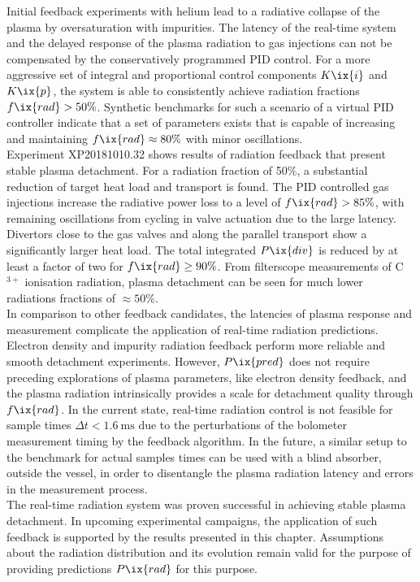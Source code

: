         Initial feedback experiments with helium lead to a radiative collapse of the plasma by oversaturation with impurities. The latency of the real-time system and the delayed response of the plasma radiation to gas injections can not be compensated by the conservatively programmed PID control. For a more aggressive set of integral and proportional control components $K\ix{i}$ and $K\ix{p}$, the system is able to consistently achieve radiation fractions $f\ix{rad}>50\%$. Synthetic benchmarks for such a scenario of a virtual PID controller indicate that a set of parameters exists that is capable of increasing and maintaining $f\ix{rad}\approx 80\%$ with minor oscillations.\\%
        Experiment XP20181010.32 shows results of radiation feedback that present stable plasma detachment. For a radiation fraction of 50\%, a substantial reduction of target heat load and transport is found. The PID controlled gas injections increase the radiative power loss to a level of $f\ix{rad}>85\%$, with remaining oscillations from cycling in valve actuation due to the large latency. Divertors close to the gas valves and along the parallel transport show a significantly larger heat load. The total integrated $P\ix{div}$ is reduced by at least a factor of two for $f\ix{rad}\ge90\%$. From filterscope measurements of C$^{3+}$ ionisation radiation, plasma detachment can be seen for much lower radiations fractions of $\approx50\%$.\\%
        In comparison to other feedback candidates, the latencies of plasma response and measurement complicate the application of real-time radiation predictions. Electron density and impurity radiation feedback perform more reliable and smooth detachment experiments. However, $P\ix{pred}$ does not require preceding explorations of plasma parameters, like electron density feedback, and the plasma radiation intrinsically provides a scale for detachment quality through $f\ix{rad}$. In the current state, real-time radiation control is not feasible for sample times $\Delta t<\SI{1.6}{\milli\second}$ due to the perturbations of the bolometer measurement timing by the feedback algorithm. In the future, a similar setup to the benchmark for actual samples times can be used with a blind absorber, outside the vessel, in order to disentangle the plasma radiation latency and errors in the measurement process.\\%
        The real-time radiation system was proven successful in achieving stable plasma detachment. In upcoming experimental campaigns, the application of such feedback is supported by the results presented in this chapter. Assumptions about the radiation distribution and its evolution remain valid for the purpose of providing predictions $P\ix{rad}$ for this purpose.%
%